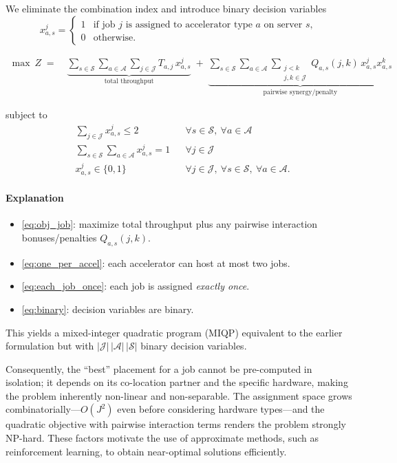 \documentclass{article}
\begin{document}
We eliminate the combination index and introduce binary decision variables
\[
x_{a,s}^{j} =
\begin{cases}
1 & \text{if job $j$ is assigned to accelerator type $a$ on server $s$},\\
0 & \text{otherwise.}
\end{cases}
\]

\begin{align}
\max\ Z \;=\;&
\underbrace{\sum_{s\in\mathcal{S}}\sum_{a\in\mathcal{A}}\sum_{j\in\mathcal{J}}
T_{a,j}\,x_{a,s}^{j}}_{\text{total throughput}}
\;+\;
\underbrace{\sum_{s\in\mathcal{S}}\sum_{a\in\mathcal{A}}
\sum_{\substack{j<k\\ j,k\in\mathcal{J}}}
Q_{a,s}(j,k)\,x_{a,s}^{j} x_{a,s}^{k}}_{\text{pairwise synergy/penalty}}
\label{eq:obj_job}
\end{align}

subject to
\begin{align}
& \sum_{j\in\mathcal{J}} x_{a,s}^{j} \le 2
&& \forall s\in\mathcal{S},\ \forall a\in\mathcal{A}
\label{eq:one_per_accel}\\[4pt]
& \sum_{s\in\mathcal{S}}\sum_{a\in\mathcal{A}} x_{a,s}^{j} = 1
&& \forall j\in\mathcal{J}
\label{eq:each_job_once}\\[4pt]
& x_{a,s}^{j} \in \{0,1\}
&& \forall j\in\mathcal{J},\ \forall s\in\mathcal{S},\ \forall a\in\mathcal{A}.
\label{eq:binary}
\end{align}

\paragraph{Explanation}
\begin{itemize}
  \item \eqref{eq:obj_job}: maximize total throughput plus any pairwise interaction bonuses/penalties \(Q_{a,s}(j,k)\).
  \item \eqref{eq:one_per_accel}: each accelerator can host at most two jobs.
  \item \eqref{eq:each_job_once}: each job is assigned \emph{exactly once}.
  \item \eqref{eq:binary}: decision variables are binary.
\end{itemize}

This yields a mixed-integer quadratic program (MIQP) equivalent to the earlier formulation but with
\(|\mathcal{J}|\,|\mathcal{A}|\,|\mathcal{S}|\) binary decision variables.

Consequently, the ``best'' placement for a job cannot be pre-computed in isolation;
it depends on its co-location partner and the specific hardware,
making the problem inherently non-linear and non-separable.
The assignment space grows combinatorially---\(O(J^{2})\) even before
considering hardware types---and the quadratic objective with pairwise
interaction terms renders the problem strongly NP-hard.
These factors motivate the use of approximate methods,
such as reinforcement learning, to obtain near-optimal solutions efficiently.
\end{document}
